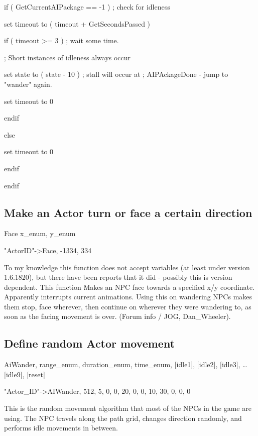 if ( GetCurrentAIPackage == -1 ) ; check for idleness

set timeout to ( timeout + GetSecondsPassed )

if ( timeout \textgreater= 3 ) ; wait some time.

; Short instances of idleness always occur

set state to ( state - 10 ) ; stall will occur at ; AIPAckageDone - jump
to "wander" again.

set timeout to 0

endif

else

set timeout to 0

endif

endif

\hypertarget{make-an-actor-turn-or-face-a-certain-direction}{%
\subsection{Make an Actor turn or face a certain
direction}\label{make-an-actor-turn-or-face-a-certain-direction}}

Face x\_enum, y\_enum

"ActorID"-\textgreater Face, -1334, 334

To my knowledge this function does not accept variables (at least under
version 1.6.1820), but there have been reports that it did - possibly
this is version dependent. This function Makes an NPC face towards a
specified x/y coordinate. Apparently interrupts current animations.
Using this on wandering NPCs makes them stop, face wherever, then
continue on wherever they were wandering to, as soon as the facing
movement is over. (Forum info / JOG, Dan\_Wheeler).

\hypertarget{define-random-actor-movement}{%
\subsection{Define random Actor
movement}\label{define-random-actor-movement}}

AiWander, range\_enum, duration\_enum, time\_enum, {[}idle1{]},
{[}idle2{]}, {[}idle3{]}, \ldots{[}idle9{]}, {[}reset{]}

"Actor\_ID"-\textgreater AIWander, 512, 5, 0, 0, 20, 0, 0, 10, 30, 0, 0,
0

This is the random movement algorithm that most of the NPCs in the game
are using. The NPC travels along the path grid, changes direction
randomly, and performs idle movements in between.

